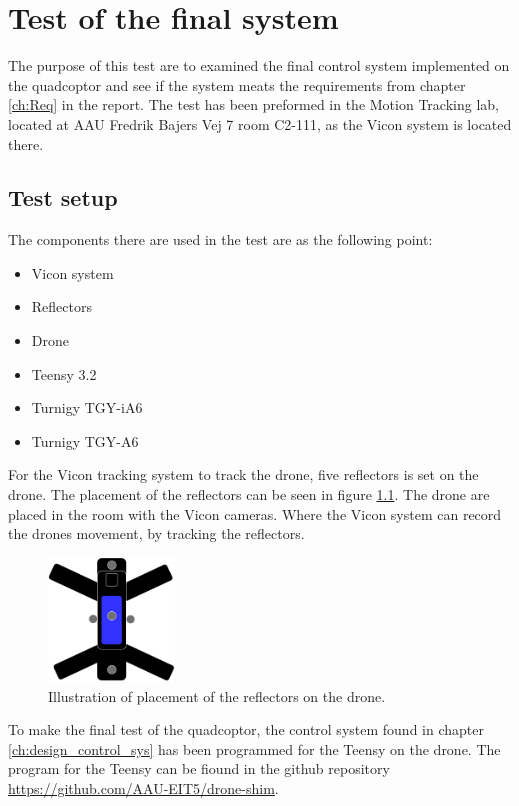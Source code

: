\chapter{Test of the final system}\label{ap:final_test_report}

The purpose of this test are to examined the final control system implemented on the quadcoptor and see if the system meats the requirements from chapter \ref{ch:Req} in the report. The test has been preformed in the Motion Tracking lab, located at AAU Fredrik Bajers Vej 7 room C2-111, as the Vicon system is located there. 


\section*{Test setup}
The components there are used in the test are as the following point:
\begin{itemize}
    \item{Vicon system}
    \item{Reflectors}
    \item{Drone}
    \item{Teensy 3.2} %
    \item{Turnigy TGY-iA6} %
    \item{Turnigy TGY-A6} %
\end{itemize}
For the Vicon tracking system to track the drone, five reflectors is set on the drone. The placement of the reflectors can be seen in figure \ref{fig:reflectors_final_test}.
The drone are placed in the room with the Vicon cameras. Where the Vicon system can record the drones movement, by tracking the reflectors. 

\begin{figure}[H]
    \centering
    \includegraphics[width=0.3\textwidth]{figures/Appendix/measuringTest/Reflector1.pdf}
    \caption{Illustration of placement of the reflectors on the drone.}
    \label{fig:reflectors_final_test}
\end{figure}

To make the final test of the quadcoptor, the control system found in chapter \ref{ch:design_control_sys} has been programmed for the Teensy on the drone. The program for the Teensy can be fiound in the github repository \url{https://github.com/AAU-EIT5/drone-shim}.

